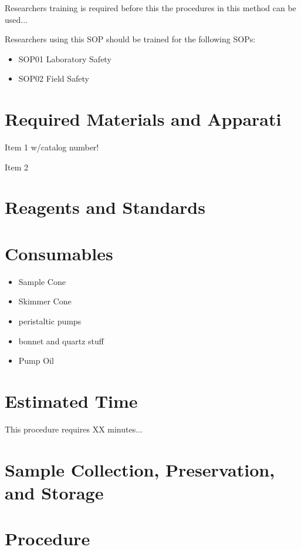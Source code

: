 \documentclass[12pt]{../SOP3_beta}
\begin{document}
\NP Researchers training is required before this the procedures in this method can be used... 

\NP Researchers using this SOP should be trained for the following SOPs:

\begin{itemize}
  \item SOP01 Laboratory Safety
  \item SOP02 Field Safety
\end{itemize}

\section{Required Materials and Apparati}

\NP Item 1 w/catalog number!

\NP Item 2

\section{Reagents and Standards}

\section{Consumables}

\begin{itemize}
  \item Sample Cone
  \item Skimmer Cone
  \item peristaltic pumps
  \item bonnet and quartz stuff
  \item Pump Oil
\end{itemize}


\section{Estimated Time}

\NP This procedure requires XX minutes...

\section{Sample Collection, Preservation, and Storage}

\section{Procedure}
\end{document}
